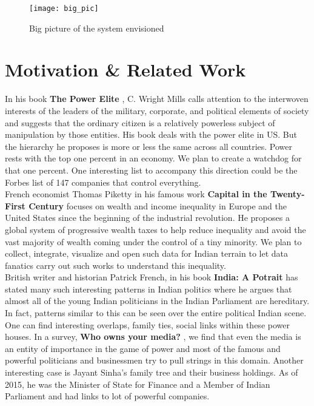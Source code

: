 \begin{figure}[H]
\begin{center}  
\texttt{[image: big\_pic]} 
\caption{Big picture of the system envisioned}
\label{fig:big_pic}
\end{center}
\end{figure}

\section{Motivation \& Related Work}

In his book \textbf{The Power Elite} \cite{Mills}, C. Wright Mills calls attention to the interwoven interests of the leaders of the military, corporate, and political elements of society and suggests that the ordinary citizen is a relatively powerless subject of manipulation by those entities. His book deals with the power elite in US. But the hierarchy he proposes is more or less the same across all countries. Power rests with the top one percent in an economy. We plan to create a watchdog for that one percent. One interesting list to accompany this direction could be the Forbes list \cite{FORBES} of 147 companies that control everything. \\ 

French economist Thomas Piketty in his famous work \textbf{Capital in the Twenty-First Century} \cite{Piketty} focuses on wealth and income inequality in Europe and the United States since the beginning of the industrial revolution. He proposes a global system of progressive wealth taxes to help reduce inequality and avoid the vast majority of wealth coming under the control of a tiny minority. We plan to collect, integrate, visualize and open such data for Indian terrain to let data fanatics carry out such works to understand this inequality. \\

British writer and historian Patrick French, in his book \textbf{India: A Potrait} \cite{French} has stated many such interesting patterns in Indian politics where he argues that almost all of the young Indian politicians in the Indian Parliament are hereditary. In fact, patterns similar to this can be seen over the entire political Indian scene. One can find interesting overlaps, family ties, social links within these power houses. In a survey, \textbf{Who owns your media?} \cite{Media}, we find that even the media is an entity of importance in the game of power and most of the famous and powerful politicians and businessmen try to pull strings in this domain. Another interesting case is Jayant Sinha's family tree \cite{Sinha} and their business holdings. As of 2015, he was the Minister of State for Finance and a Member of Indian Parliament and had links to lot of powerful companies. \\

